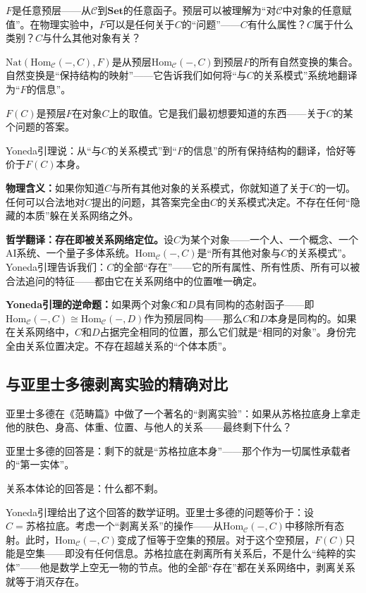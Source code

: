 \documentclass[11pt,a4paper]{book}
\theoremstyle{definition}
\begin{document}
$F$是任意预层——从$\mathcal{C}$到$\mathbf{Set}$的任意函子。预层可以被理解为“对$\mathcal{C}$中对象的任意赋值”。在物理实验中，$F$可以是任何关于$C$的“问题”——$C$有什么属性？$C$属于什么类别？$C$与什么其他对象有关？

$\text{Nat}(\text{Hom}_{\mathcal{C}}(-, C), F)$是从预层$\text{Hom}_{\mathcal{C}}(-, C)$到预层$F$的所有自然变换的集合。自然变换是“保持结构的映射”——它告诉我们如何将“与$C$的关系模式”系统地翻译为“$F$的信息”。

$F(C)$是预层$F$在对象$C$上的取值。它是我们最初想要知道的东西——关于$C$的某个问题的答案。

Yoneda引理说：从“与$C$的关系模式”到“$F$的信息”的所有保持结构的翻译，恰好等价于$F(C)$本身。

\textbf{物理含义：}如果你知道$C$与所有其他对象的关系模式，你就知道了关于$C$的一切。任何可以合法地对$C$提出的问题，其答案完全由$C$的关系模式决定。不存在任何“隐藏的本质”躲在关系网络之外。

\textbf{哲学翻译：存在即被关系网络定位。}设$C$为某个对象——一个人、一个概念、一个AI系统、一个量子多体系统。$\text{Hom}_{\mathcal{C}}(-, C)$是“所有其他对象与$C$的关系模式”。Yoneda引理告诉我们：$C$的全部“存在”——它的所有属性、所有性质、所有可以被合法追问的特征——都由它在关系网络中的位置唯一确定。

\textbf{Yoneda引理的逆命题：}如果两个对象$C$和$D$具有同构的态射函子——即$\text{Hom}_{\mathcal{C}}(-, C) \cong \text{Hom}_{\mathcal{C}}(-, D)$作为预层同构——那么$C$和$D$本身是同构的。如果在关系网络中，$C$和$D$占据完全相同的位置，那么它们就是“相同的对象”。身份完全由关系位置决定。不存在超越关系的“个体本质”。

\subsection{与亚里士多德剥离实验的精确对比}

亚里士多德在《范畴篇》中做了一个著名的“剥离实验”：如果从苏格拉底身上拿走他的肤色、身高、体重、位置、与他人的关系——最终剩下什么？

亚里士多德的回答是：剩下的就是“苏格拉底本身”——那个作为一切属性承载者的“第一实体”。

关系本体论的回答是：什么都不剩。

Yoneda引理给出了这个回答的数学证明。亚里士多德的问题等价于：设$C = \text{苏格拉底}$。考虑一个“剥离关系”的操作——从$\text{Hom}_{\mathcal{C}}(-, C)$中移除所有态射。此时，$\text{Hom}_{\mathcal{C}}(-, C)$变成了恒等于空集的预层。对于这个空预层，$F(C)$只能是空集——即没有任何信息。苏格拉底在剥离所有关系后，不是什么“纯粹的实体”——他是数学上空无一物的节点。他的全部“存在”都在关系网络中，剥离关系就等于消灭存在。
\end{document}
